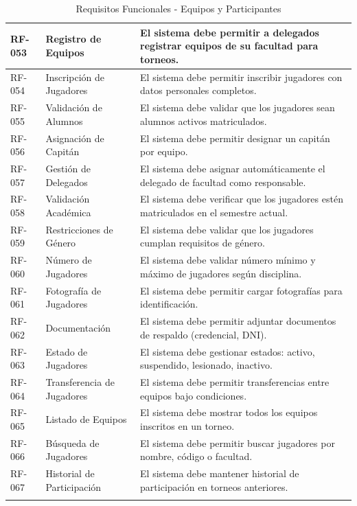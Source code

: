 \documentclass[12pt,a4paper]{article}
\begin{document}
\begin{longtable}{|>{\centering\arraybackslash}p{1.5cm}|>{\raggedright\arraybackslash}p{3.2cm}|>{\raggedright\arraybackslash}p{9cm}|}
RF-053 & Registro de Equipos & El sistema debe permitir a delegados registrar equipos de su facultad para torneos. \\
\hline
\rowcolor{rowgray}
RF-054 & Inscripción de Jugadores & El sistema debe permitir inscribir jugadores con datos personales completos. \\
\hline
RF-055 & Validación de Alumnos & El sistema debe validar que los jugadores sean alumnos activos matriculados. \\
\hline
\rowcolor{rowgray}
RF-056 & Asignación de Capitán & El sistema debe permitir designar un capitán por equipo. \\
\hline
RF-057 & Gestión de Delegados & El sistema debe asignar automáticamente el delegado de facultad como responsable. \\
\hline
\rowcolor{rowgray}
RF-058 & Validación Académica & El sistema debe verificar que los jugadores estén matriculados en el semestre actual. \\
\hline
RF-059 & Restricciones de Género & El sistema debe validar que los jugadores cumplan requisitos de género. \\
\hline
\rowcolor{rowgray}
RF-060 & Número de Jugadores & El sistema debe validar número mínimo y máximo de jugadores según disciplina. \\
\hline
RF-061 & Fotografía de Jugadores & El sistema debe permitir cargar fotografías para identificación. \\
\hline
\rowcolor{rowgray}
RF-062 & Documentación & El sistema debe permitir adjuntar documentos de respaldo (credencial, DNI). \\
\hline
RF-063 & Estado de Jugadores & El sistema debe gestionar estados: activo, suspendido, lesionado, inactivo. \\
\hline
\rowcolor{rowgray}
RF-064 & Transferencia de Jugadores & El sistema debe permitir transferencias entre equipos bajo condiciones. \\
\hline
RF-065 & Listado de Equipos & El sistema debe mostrar todos los equipos inscritos en un torneo. \\
\hline
\rowcolor{rowgray}
RF-066 & Búsqueda de Jugadores & El sistema debe permitir buscar jugadores por nombre, código o facultad. \\
\hline
RF-067 & Historial de Participación & El sistema debe mantener historial de participación en torneos anteriores. \\
\hline
\caption{Requisitos Funcionales - Equipos y Participantes}
\end{longtable}
\end{document}
